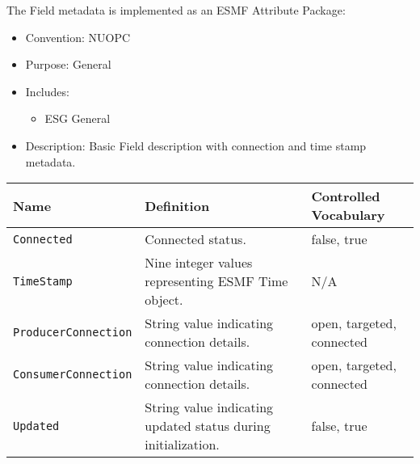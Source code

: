 The Field metadata is implemented as an ESMF Attribute Package:

\begin{itemize}
    \item Convention: NUOPC
    \item Purpose: General
    \item Includes:
    \begin{itemize}
        \item ESG General
    \end{itemize} 
    \item Description: Basic Field description with connection and time stamp metadata. 
\end{itemize}

\begin{tabular}{|p{5cm}|p{5cm}|p{35mm}|}
     \hline\hline
     {\bf Name} & {\bf Definition} & {\bf Controlled Vocabulary}\\
     \hline\hline
     {\tt Connected} & Connected status.& false, true\\
     {\tt TimeStamp} & Nine integer values representing ESMF Time object.& N/A\\
     {\tt ProducerConnection} & String value indicating connection details.& open, targeted, connected\\
     {\tt ConsumerConnection} & String value indicating connection details.& open, targeted, connected\\
     {\tt Updated} & String value indicating updated status during initialization.& false, true\\
     \hline\hline
\end{tabular}
